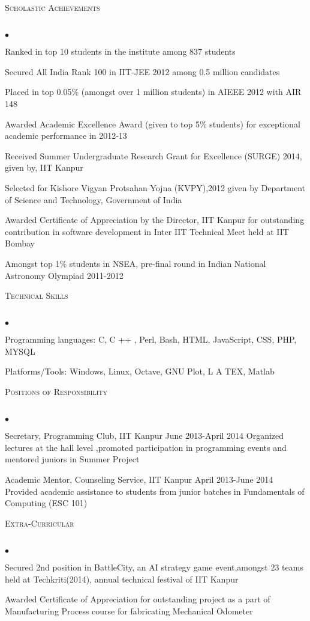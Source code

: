 \documentclass{article}
\newcommand{\lineunder}{\vspace*{-8pt} \\ \hspace*{-18pt} \hrulefill \\}
\newcommand{\header}[1]{{\hspace*{-15pt}\vspace*{6pt} \textsc{#1}} \vspace*{-6pt} \lineunder}
\newenvironment{achievements}{\begin{list}{$\bullet$}{\topsep 0pt \itemsep -2pt}}{\vspace*{4pt}\end{list}}
\begin{document}
\header{Scholastic Achievements}
\begin{achievements}
\item Ranked in top 10 students in the institute among 837 students
\item Secured All India Rank 100 in IIT-JEE 2012 among 0.5 million candidates
\item Placed in top 0.05\% (amongst over 1 million students) in AIEEE 2012 with AIR 148
\item Awarded Academic Excellence Award (given to top 5\% students) for exceptional academic performance in
2012-13
\item Received Summer Undergraduate Research Grant for Excellence (SURGE) 2014, given by, IIT Kanpur
\item Selected for Kishore Vigyan Protsahan Yojna (KVPY),2012 given by Department of Science and Technology,
Government of India
\item Awarded Certificate of Appreciation by the Director, IIT Kanpur for outstanding contribution in software
development in Inter IIT Technical Meet held at IIT Bombay
\item Amongst top 1\% students in NSEA, pre-final round in Indian National Astronomy Olympiad 2011-2012
\end{achievements}



\header{Technical Skills}
\begin{achievements}
\item Programming languages: C, C ++ , Perl, Bash, HTML, JavaScript, CSS, PHP, MYSQL
\item Platforms/Tools: Windows, Linux, Octave, GNU Plot, L A TEX, Matlab
\end{achievements}

\header{Positions of Responsibility}
\begin{achievements}
\item Secretary, Programming Club, IIT Kanpur
June 2013-April 2014
Organized lectures at the hall level ,promoted participation in programming events and mentored juniors in
Summer Project
\item Academic Mentor, Counseling Service, IIT Kanpur
April 2013-June 2014
Provided academic assistance to students from junior batches in Fundamentals of Computing (ESC 101)
\end{achievements}

\header{Extra-Curricular}
\begin{achievements}
\item Secured 2nd position in BattleCity, an AI strategy game event,amongst 23 teams held at Techkriti(2014),
annual technical festival of IIT Kanpur
\item Awarded Certificate of Appreciation for outstanding project as a part of Manufacturing Process course for
fabricating Mechanical Odometer
\end{achievements}
\end{document}
